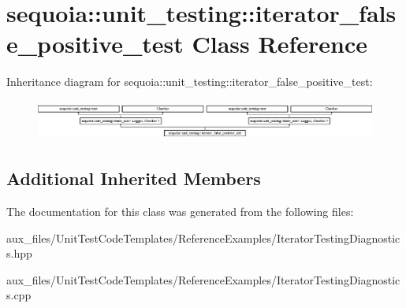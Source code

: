 \hypertarget{classsequoia_1_1unit__testing_1_1iterator__false__positive__test}{}\section{sequoia\+::unit\+\_\+testing\+::iterator\+\_\+false\+\_\+positive\+\_\+test Class Reference}
\label{classsequoia_1_1unit__testing_1_1iterator__false__positive__test}
Inheritance diagram for sequoia\+::unit\+\_\+testing\+::iterator\+\_\+false\+\_\+positive\+\_\+test\+:\begin{figure}[H]
\begin{center}
\leavevmode
\includegraphics[height=1.333333cm]{classsequoia_1_1unit__testing_1_1iterator__false__positive__test}
\end{center}
\end{figure}
\subsection*{Additional Inherited Members}


The documentation for this class was generated from the following files\+:\begin{DoxyCompactItemize}
\item 
aux\+\_\+files/\+Unit\+Test\+Code\+Templates/\+Reference\+Examples/Iterator\+Testing\+Diagnostics.\+hpp\item 
aux\+\_\+files/\+Unit\+Test\+Code\+Templates/\+Reference\+Examples/Iterator\+Testing\+Diagnostics.\+cpp\end{DoxyCompactItemize}
